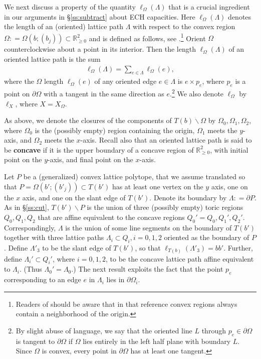\documentclass[11pt, reqno]{amsart}
\theoremstyle{remark}
\numberwithin{equation}{subsection}
\numberwithin{figure}{section}
\theoremstyle{customremark}
\newcommand{\Om}{{\Omega}}
\newcommand{\La}{{\Lambda}}
\newcommand{\less} {{\smallsetminus}}
\newcommand{\p}{{\partial}}
\newcommand{\R}{\mathbb{R}}
\begin{document}
 We next discuss a property of the quantity $\ell_\Omega(\Lambda)$ that is a crucial ingredient in our arguments in \S\ref{ss:subtract}
 about ECH capacities.
 Here $\ell_\Omega(\Lambda)$ denotes
 the length of an (oriented) lattice path $\La$ 
 with respect to the convex region $\Om: = \Om(b; (b_j))\subset \R^2_{\ge 0}$ and is defined as follows, see  \cite[App]{CG}.\footnote
 {Readers of \cite[App]{CG} should be aware that in that reference convex regions always contain a neighborhood of the origin.}
Orient  $\Omega$ counterclockwise about a point in its interior.
Then the  length $\ell_\Omega(\Lambda)$ of an oriented  lattice path
 is the sum
 \begin{align}\label{eq:Omlength} 
\ell_\Omega(\Lambda) = \sum_{e\in \La} \ell_\Omega(e),
\end{align}
where  the ${\Omega}$ length $\ell_\Omega(e)$ of any oriented edge $e\in \La$ is $e \times p_e$, where $p_e$ is a point on $\p \Omega$ with a tangent in the same direction as $e$.\footnote
 {
 By slight abuse of language, we say that the oriented line $L$ through $p_e\in \p\Om$ is tangent to $\p\Om$ if $\Om$ lies entirely in the left  half plane with boundary $L$. Since $\Om$ is convex, every point in $\p \Om$ has at least one tangent.}
We also denote $\ell_\Om$ by $\ell_X$, where  $X = X_\Om$.
 
  As above, we denote the closures of the components of $T(b) \less \Om$ by 
$\Om_0, \Om_1, \Om_2$, where $\Om_0$ is the (possibly empty) region containing the origin,  $\Om_1$ meets the $y$-axis, and $\Om_2$ meets the $x$-axis. 
Recall also that  an oriented lattice path is said to be {\bf concave} if it is the upper boundary of a concave region of $\R^2_{\ge 0}$, with initial point on the $y$-axis, and final point on the $x$-axis.

Let $P$ be a (generalized) 
convex lattice polytope, that we assume   translated  so that $P = \Om(b';(b'_j)) \subset T(b')$ has at least one vertex on the $y$ axis, one on the $x$ axis, and one on the slant edge of $T(b')$.  Denote its boundary by $\La: = \p P$.
 As in \S\ref{ss:cut},  $T(b') \less P$ is the union of three (possibly empty)  toric regions $Q_0, Q_1,Q_2$ that are affine equivalent to the concave regions $Q_0'=Q_0, Q_1', Q_2'$.
Correspondingly, $\La$ is the union of some line segments on the boundary of $T(b')$ together with three lattice paths $\La_i\subset Q_i, i=0,1,2$ oriented as the boundary of $P$. Define  $\La'_3$ to be the slant edge of $T(b')$,  so that 
$ \ell_{T(b)}(\Lambda'_3)=b b'$.
Further,  define
$\La_i'\subset Q_i'$, where $ i=0,1,2$, to be the concave lattice path affine equivalent to $\La_i$.  (Thus $\La_0' = \La_0$.) 
The next  result exploits the fact that the point $p_e$ corresponding to an edge $e$  in $\La_i$ lies in $\p \Om_i$.
\end{document}
